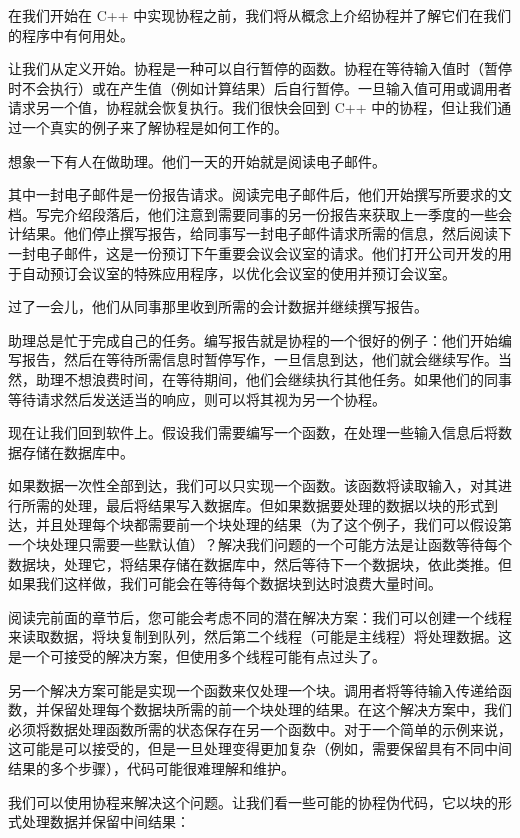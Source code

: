 在我们开始在 C++ 中实现协程之前，我们将从概念上介绍协程并了解它们在我们的程序中有何用处。

让我们从定义开始。协程是一种可以自行暂停的函数。协程在等待输入值时（暂停时不会执行）或在产生值（例如计算结果）后自行暂停。一旦输入值可用或调用者请求另一个值，协程就会恢复执行。我们很快会回到 C++ 中的协程，但让我们通过一个真实的例子来了解协程是如何工作的。

想象一下有人在做助理。他们一天的开始就是阅读电子邮件。

其中一封电子邮件是一份报告请求。阅读完电子邮件后，他们开始撰写所要求的文档。写完介绍段落后，他们注意到需要同事的另一份报告来获取上一季度的一些会计结果。他们停止撰写报告，给同事写一封电子邮件请求所需的信息，然后阅读下一封电子邮件，这是一份预订下午重要会议会议室的请求。他们打开公司开发的用于自动预订会议室的特殊应用程序，以优化会议室的使用并预订会议室。

过了一会儿，他们从同事那里收到所需的会计数据并继续撰写报告。

助理总是忙于完成自己的任务。编写报告就是协程的一个很好的例子：他们开始编写报告，然后在等待所需信息时暂停写作，一旦信息到达，他们就会继续写作。当然，助理不想浪费时间，在等待期间，他们会继续执行其他任务。如果他们的同事等待请求然后发送适当的响应，则可以将其视为另一个协程。

现在让我们回到软件上。假设我们需要编写一个函数，在处理一些输入信息后将数据存储在数据库中。

如果数据一次性全部到达，我们可以只实现一个函数。该函数将读取输入，对其进行所需的处理，最后将结果写入数据库。但如果数据要处理的数据以块的形式到达，并且处理每个块都需要前一个块处理的结果（为了这个例子，我们可以假设第一个块处理只需要一些默认值）？解决我们问题的一个可能方法是让函数等待每个数据块，处理它，将结果存储在数据库中，然后等待下一个数据块，依此类推。但如果我们这样做，我们可能会在等待每个数据块到达时浪费大量时间。

阅读完前面的章节后，您可能会考虑不同的潜在解决方案：我们可以创建一个线程来读取数据，将块复制到队列，然后第二个线程（可能是主线程）将处理数据。这是一个可接受的解决方案，但使用多个线程可能有点过头了。

另一个解决方案可能是实现一个函数来仅处理一个块。调用者将等待输入传递给函数，并保留处理每个数据块所需的前一个块处理的结果。在这个解决方案中，我们必须将数据处理函数所需的状态保存在另一个函数中。对于一个简单的示例来说，这可能是可以接受的，但是一旦处理变得更加复杂（例如，需要保留具有不同中间结果的多个步骤），代码可能很难理解和维护。

我们可以使用协程来解决这个问题。让我们看一些可能的协程伪代码，它以块的形式处理数据并保留中间结果：

